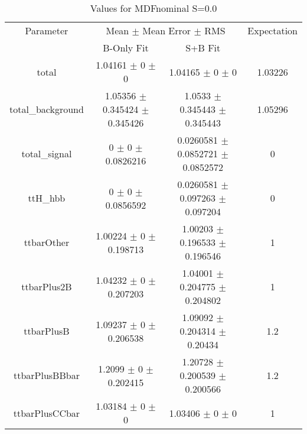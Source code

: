 \begin{table}
\centering
\caption{Values for MDFnominal S=0.0}
\begin{tabular}{cccc}
\toprule
Parameter & \multicolumn{2}{c}{Mean $\pm$ Mean Error $\pm$ RMS} & Expectation\\
 & B-Only Fit & S+B Fit & \\
\midrule
total & \num{1.04161} $\pm$ \num{0} $\pm$ \num{0} & \num{1.04165} $\pm$ \num{0} $\pm$ \num{0} & \num{1.03226}\\
total\_background & \num{1.05356} $\pm$ \num{0.345424} $\pm$ \num{0.345426} & \num{1.0533} $\pm$ \num{0.345443} $\pm$ \num{0.345443} & \num{1.05296}\\
total\_signal & \num{0} $\pm$ \num{0} $\pm$ \num{0.0826216} & \num{0.0260581} $\pm$ \num{0.0852721} $\pm$ \num{0.0852572} & \num{0}\\
ttH\_hbb & \num{0} $\pm$ \num{0} $\pm$ \num{0.0856592} & \num{0.0260581} $\pm$ \num{0.097263} $\pm$ \num{0.097204} & \num{0}\\
ttbarOther & \num{1.00224} $\pm$ \num{0} $\pm$ \num{0.198713} & \num{1.00203} $\pm$ \num{0.196533} $\pm$ \num{0.196546} & \num{1}\\
ttbarPlus2B & \num{1.04232} $\pm$ \num{0} $\pm$ \num{0.207203} & \num{1.04001} $\pm$ \num{0.204775} $\pm$ \num{0.204802} & \num{1}\\
ttbarPlusB & \num{1.09237} $\pm$ \num{0} $\pm$ \num{0.206538} & \num{1.09092} $\pm$ \num{0.204314} $\pm$ \num{0.20434} & \num{1.2}\\
ttbarPlusBBbar & \num{1.2099} $\pm$ \num{0} $\pm$ \num{0.202415} & \num{1.20728} $\pm$ \num{0.200539} $\pm$ \num{0.200566} & \num{1.2}\\
ttbarPlusCCbar & \num{1.03184} $\pm$ \num{0} $\pm$ \num{0} & \num{1.03406} $\pm$ \num{0} $\pm$ \num{0} & \num{1}\\
\bottomrule
\end{tabular}
\end{table}